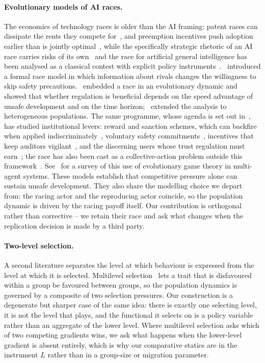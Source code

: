 \documentclass[11pt,a4paper]{article}
\theoremstyle{definition}
\begin{document}
\paragraph{Evolutionary models of AI races.}
The economics of technology races is older than the AI framing: patent races
can dissipate the rents they
compete for~\citep{loury1979market}, and preemption incentives push adoption
earlier than is jointly optimal~\citep{fudenberg1985preemption}, while the
specifically strategic rhetoric of an AI race carries risks of its
own~\citep{cave2018race} and the race for artificial general intelligence has
been analysed as a classical contest with explicit policy
instruments~\citep{naude2020race}.~\citet{armstrong2016precipice} introduced a formal
race model in which
information about rivals changes the willingness to skip safety precautions.~\citet{han2020regulate} embedded a race in an evolutionary dynamic and showed
that whether regulation is beneficial depends on the speed advantage of unsafe
development and on the time horizon;~\citet{cimpeanu2022heterogeneous}
extended the analysis to heterogeneous populations. The same programme, whose
agenda is set out in~\citet{han2019bidding}, has studied institutional levers:
reward and sanction schemes, which can backfire when applied
indiscriminately~\citep{han2021mediating}, voluntary safety
commitments~\citep{han2022voluntary}, incentives that keep auditors
vigilant~\citep{bova2024vigilant}, and the discerning users whose trust
regulation must earn~\citep{alalawi2026trust}; the race has also been cast as a
collective-action problem outside this framework~\citep{lacroix2022tragedy}.
See~\citet{han2022emergent}
for a survey of this use of evolutionary game theory in multi-agent systems.
These models establish
that competitive pressure alone can sustain unsafe development. They also
share the modelling choice we depart from: the racing actor and the
reproducing actor coincide, so the population dynamic is driven by the racing
payoff itself. Our contribution is orthogonal rather than corrective -- we
retain their race and ask what changes when the replication decision is made
by a third party.

\paragraph{Two-level selection.}
A second literature separates the level at which behaviour is expressed from
the level at which it is selected. Multilevel selection~\citep{wilson1975group,traulsen2006multilevel,okasha2006levels} lets a trait
that is disfavoured within a group be favoured between groups, so the
population dynamics is governed by a composite of two selection pressures.
Our construction is a degenerate but sharper case of the same idea: there is
exactly one selecting level, it is not the level that plays, and the
functional it selects on is a policy variable rather than an aggregate of the
lower level. Where multilevel selection asks which of two competing gradients
wins, we ask what happens when the lower-level gradient is absent entirely,
which is why our comparative statics are in the instrument $L$ rather than in
a group-size or migration parameter.
\end{document}
